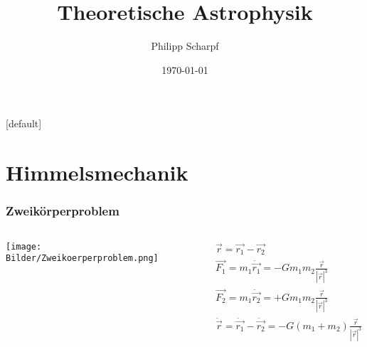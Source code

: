 \documentclass{beamer}
\title{Theoretische Astrophysik}
\author{Philipp Scharpf}
\institute{Universität Konstanz}
\date{\today}
\begin{document}
{
\makeatletter %
    [default]
    \def\beamer@entrycode{\vspace*{-\headheight}}
\makeatother

}

\renewcommand{\thesection}{\Roman{section}} 

\frame{\titlepage}

\frame{\tiny\tableofcontents[hideallsubsections]}

\section{Himmelsmechanik}

\begin{frame}\frametitle{Zweikörperproblem}

\begin{columns}

\begin{column}{.48\textwidth}

\texttt{[image: Bilder/Zweikoerperproblem.png]}

\end{column}

\hfill

\begin{column}{.48\textwidth}

\begin{align*}\label{eq:Zweikoerperproblem}
\vec{r} = \vec{r_1} - \vec{r_2}\\
\vec{F_1} = m_1 \ddot{\vec{r_1}} = - G m_1 m_2 \frac{\vec{r}}{|\vec{r}|^3}\\
\vec{F_2} = m_1 \ddot{\vec{r_2}} = + G m_1 m_2 \frac{\vec{r}}{|\vec{r}|^3}\\[.25cm]
\ddot{\vec{r}} = \ddot{\vec{r_1}} - \ddot{\vec{r_2}} = - G(m_1 + m_2) \frac{\vec{r}}{|\vec{r}|^3}
\end{align*}

\end{column}

\end{columns}

\end{frame}
\end{document}
